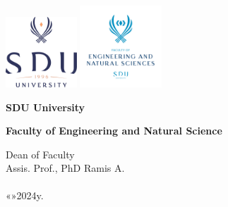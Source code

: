 \newpage
\pagestyle{empty}
\begin{center}

\includegraphics[width=0.2\textwidth]{figures/Log_SDU.png}
\includegraphics[width=0.23\textwidth]{figures/Faculty.png}
\vspace{0.5cm}
\large 
\par
\textbf{SDU University} 

\large \textbf{Faculty of Engineering and Natural  Science}

\vspace{2cm}
\normalsize\hspace{9.5cm} Dean of Faculty \\
\normalsize\hspace{9.5cm} Assis. Prof., PhD Ramis A. \\
\normalsize\hspace{9.5cm}\underline{\hspace{6cm}} \\
\normalsize\hspace{9.5cm}«\underline{\hspace{0.5cm}}»\underline{\hspace{4cm}}2024y. \\


\end{center}
